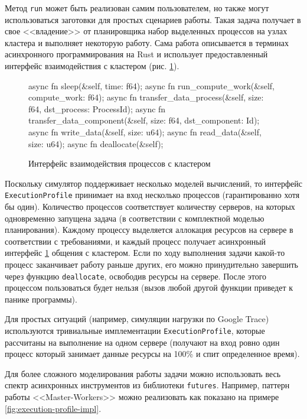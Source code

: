 Метод \texttt{run} может быть реализован самим пользователем, но также могут использоваться заготовки для простых сценариев работы. Такая задача получает в свое <<владение>> от планировщика набор выделенных процессов на узлах кластера и выполняет некоторую работу. Сама работа описывается в терминах асинхронного программирования на Rust и использует предоставленный интерфейс взаимодействия с кластером (рис. \ref{fig:process-cluster-interface}). 
\begin{figure}[h!]
    \footnotesize
\begin{rustcode}
async fn sleep(&self, time: f64);
async fn run_compute_work(&self, compute_work: f64);
async fn transfer_data_process(&self, size: f64, dst_process: ProcessId);
async fn transfer_data_component(&self, size: f64, dst_component: Id);
async fn write_data(&self, size: u64);
async fn read_data(&self, size: u64);
async fn deallocate(&self);
\end{rustcode}
\caption{Интерфейс взаимодействия процессов с кластером}
\label{fig:process-cluster-interface}
\end{figure}

Поскольку симулятор поддерживает несколько моделей вычислений, то интерфейс \\ \texttt{ExecutionProfile} принимает на вход несколько процессов (гарантированно хотя бы один). Количество процессов соответствует количеству серверов, на которых одновременно запущена задача (в соответствии с комплектной моделью планирования). Каждому процессу выделяется аллокация ресурсов на сервере в соответствии с требованиями, и каждый процесс получает асинхронный интерфейс \ref{fig:process-cluster-interface} общения с кластером. Если по ходу выполнения задачи какой-то процесс заканчивает работу раньше других, его можно принудительно завершить через функцию \texttt{deallocate}, освободив ресурсы на сервере. После этого процессом пользоваться будет нельзя (вызов любой другой функции приведет к панике программы).

Для простых ситуаций (например, симуляции нагрузки по Google Trace) используются тривиальные имплементации \texttt{ExecutionProfile}, которые рассчитаны на выполнение на одном сервере (получают на вход ровно один процесс который занимает данные ресурсы на 100\% и спит определенное время).  

Для более сложного моделирования работы задачи можно использовать весь спектр асинхронных инструментов из библиотеки \texttt{futures}\cite{rust-futures}. Например, паттерн работы <<Master-Workers>> можно реализовать как показано на примере \ref{fig:execution-profile-impl}.

